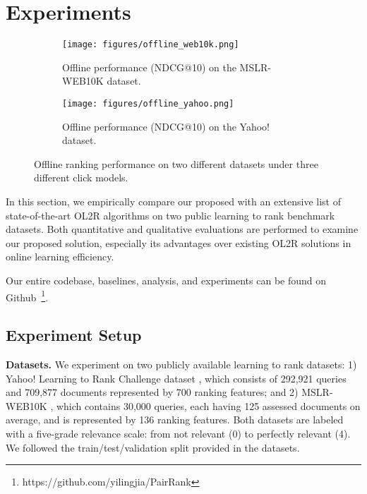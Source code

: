 \section{Experiments}

\begin{figure*}[t]
  \centering
  \begin{subfigure}[b]{\textwidth}
    \centering
    \texttt{[image: figures/offline\_web10k.png]}
    \caption{Offline performance (NDCG@10) on the MSLR-WEB10K dataset.}
    \label{fig:offline_WEB10K}
  \end{subfigure}
  \begin{subfigure}[b]{\textwidth}
    \centering
    \texttt{[image: figures/offline\_yahoo.png]}
    \caption{Offline performance (NDCG@10) on the Yahoo! dataset.}
    \vspace{-2mm}
    \label{fig:offline_Yahoo}
  \end{subfigure}
  \caption{Offline ranking performance on two different datasets under three different click models.}
  \label{fig:result}
  \vspace{-4mm}
\end{figure*}

In this section, we empirically compare our proposed \model{} with an extensive list of state-of-the-art OL2R algorithms on two public learning to rank benchmark datasets. Both quantitative and qualitative evaluations are performed to examine our proposed solution, especially its advantages over existing OL2R solutions in online learning efficiency. 

Our entire codebase, baselines, analysis, and experiments can be found on
Github~\footnote{https://github.com/yilingjia/PairRank}.

\subsection{Experiment Setup}

\textbf{Datasets.} We experiment on two publicly available learning to rank datasets: 1) Yahoo! Learning to Rank Challenge dataset \cite{chapelle2011yahoo}, which consists of 292,921 queries and 709,877 documents represented by 700 ranking features; and 2) MSLR-WEB10K \cite{qin2013introducing}, which contains 30,000 queries, each having 125 assessed documents on average, and is represented by 136 ranking features. Both datasets are labeled with a five-grade relevance scale: from not relevant (0) to perfectly relevant (4). We followed the train/test/validation split provided in the datasets.


